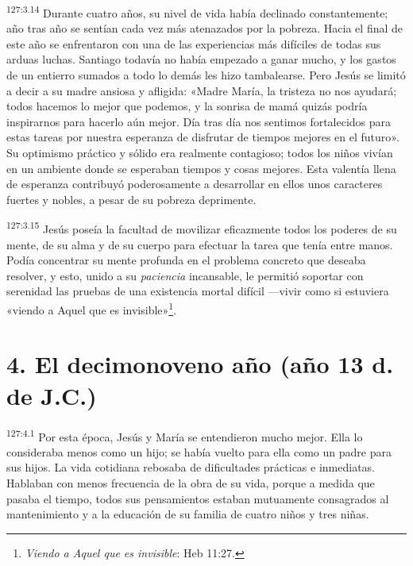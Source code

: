 \par 
\textsuperscript{127:3.14} Durante cuatro años, su nivel de vida había declinado constantemente; año tras año se sentían cada vez más atenazados por la pobreza. Hacia el final de este año se enfrentaron con una de las experiencias más difíciles de todas sus arduas luchas. Santiago todavía no había empezado a ganar mucho, y los gastos de un entierro sumados a todo lo demás les hizo tambalearse. Pero Jesús se limitó a decir a su madre ansiosa y afligida: «Madre María, la tristeza no nos ayudará; todos hacemos lo mejor que podemos, y la sonrisa de mamá quizás podría inspirarnos para hacerlo aún mejor. Día tras día nos sentimos fortalecidos para estas tareas por nuestra esperanza de disfrutar de tiempos mejores en el futuro». Su optimismo práctico y sólido era realmente contagioso; todos los niños vivían en un ambiente donde se esperaban tiempos y cosas mejores. Esta valentía llena de esperanza contribuyó poderosamente a desarrollar en ellos unos caracteres fuertes y nobles, a pesar de su pobreza deprimente.

\par 
\textsuperscript{127:3.15} Jesús poseía la facultad de movilizar eficazmente todos los poderes de su mente, de su alma y de su cuerpo para efectuar la tarea que tenía entre manos. Podía concentrar su mente profunda en el problema concreto que deseaba resolver, y esto, unido a su \textit{paciencia} incansable, le permitió soportar con serenidad las pruebas de una existencia mortal difícil ---vivir como si estuviera «viendo a Aquel que es invisible»\footnote{\textit{Viendo a Aquel que es invisible}: Heb 11:27.}.

\section*{4. El decimonoveno año (año 13 d. de J.C.)}
\par 
\textsuperscript{127:4.1} Por esta época, Jesús y María se entendieron mucho mejor. Ella lo consideraba menos como un hijo; se había vuelto para ella como un padre para sus hijos. La vida cotidiana rebosaba de dificultades prácticas e inmediatas. Hablaban con menos frecuencia de la obra de su vida, porque a medida que pasaba el tiempo, todos sus pensamientos estaban mutuamente consagrados al mantenimiento y a la educación de su familia de cuatro niños y tres niñas.

